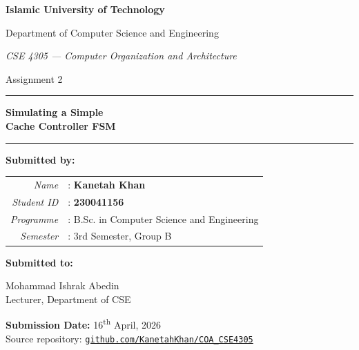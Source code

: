 \documentclass[11pt,a4paper]{article}
\begin{document}

\begin{titlepage}
    \centering
    \vspace*{1cm}
    {\Large\bfseries Islamic University of Technology\par}
    \vspace{0.3cm}
    {\large Department of Computer Science and Engineering\par}
    \vspace{1.4cm}
    {\itshape CSE 4305 — Computer Organization and Architecture\par}
    \vspace{0.3cm}
    {\large Assignment 2\par}
    \vspace{1.6cm}
    \rule{\linewidth}{0.5pt}
    \vspace{0.3cm}

    {\Huge\bfseries Simulating a Simple\\[0.3em]
     Cache Controller FSM\par}
    \vspace{0.3cm}
    \rule{\linewidth}{0.5pt}

    \vspace{2.2cm}
    {\bfseries Submitted by:\par}
    \vspace{0.6cm}
    \begin{tabular}{rl}
        \textit{Name}        & : \textbf{Kanetah Khan} \\
        \textit{Student ID}  & : \textbf{230041156} \\
        \textit{Programme}   & : B.Sc. in Computer Science and Engineering \\
        \textit{Semester}    & : 3rd Semester, Group B \\
    \end{tabular}

    \vspace{1.6cm}
    {\bfseries Submitted to:\par}
    \vspace{0.4cm}
    Mohammad Ishrak Abedin\\
    Lecturer, Department of CSE

    \vfill
    \textbf{Submission Date:} 16\textsuperscript{th} April, 2026\\[0.3em]
    {\small Source repository: \href{https://github.com/KanetahKhan/COA_CSE4305}{%
     \texttt{github.com/KanetahKhan/COA\_CSE4305}}}
\end{titlepage}
\end{document}
